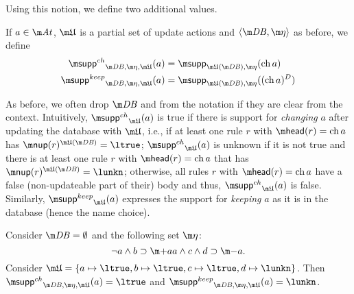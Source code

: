 Using this notion, we define two additional values. 

\begin{definition}
If $a\in \atoms$, $\UUU$ is a partial set of update actions and $\langle \db, \aics\rangle$ as before, we define 
\begin{align*}
 \suppin_{\db,\aics,\UUU}(a) &= \supp_{\UUU(\db), \aics}(\change a)\\
  \suppout_{\db,\aics,\UUU}(a) &= \supp_{\UUU(\db), \aics}((\change a)^D)
\end{align*}
\end{definition}
As before, we often drop $\db$ and \aics from the notation if they are clear from the context. 
Intuitively, 
$\suppin_{\UUU}(a)$ is true if there is support for \emph{changing} $a$ after updating the database with $\UUU$, i.e., if at least one rule $r$ with $\head(r)=\change a$ has $\nup(r)^{\UUU(\db)} = \ltrue$;  
$\suppin_{\UUU}(a)$ is unknown if it is not true and there is at least one rule $r$ with $\head(r)=\change a$ that has $\nup(r)^{\UUU(\db)} = \lunkn$; 
otherwise, all rules $r$ with $\head(r)=\change a$ have a false (non-updateable part of their) body and thus, $\suppin_{\UUU}(a)$ is false. 
Similarly, $\suppout_{\UUU}(a)$ expresses the support for \emph{keeping} $a$ as it is in the database (hence the name choice). 

\begin{example}
 Consider $\db=\emptyset$ and the following set $\aics$:
 \[\lnot a\land b \aicrule \add a\\  a \land c\land d \aicrule\remove a.\]
 Consider $\UUU = \{a\mapsto\ltrue,b\mapsto\ltrue, c\mapsto\ltrue, d\mapsto\lunkn\}$. 
 Then  $\suppin_{\db,\aics,\UUU}(a)=\ltrue$ and $\suppout_{\db,\aics,\UUU}(a)=\lunkn$. 
\end{example}





